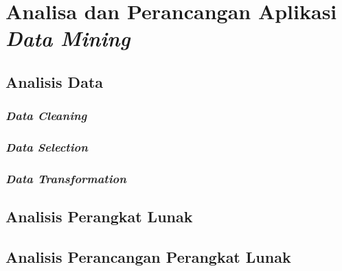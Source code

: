 \chapter{Analisa dan Perancangan Aplikasi \textsl{Data Mining}}

\section{Analisis Data}

\subsection{\textsl{Data Cleaning}}

\subsection{\textsl{Data Selection}}

\subsection{\textsl{Data Transformation}}

\section{Analisis Perangkat Lunak}
\section{Analisis Perancangan Perangkat Lunak}